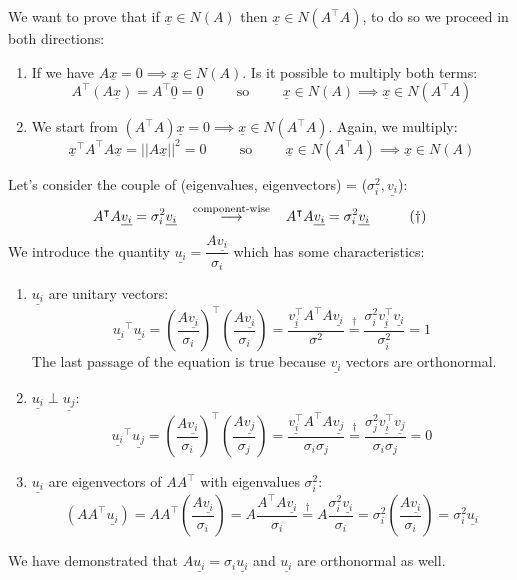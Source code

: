 We want to prove that if  $\underline{x} \in N(A)$ then $\underline{x} \in N(A^\intercal A)$, to do so we proceed in both directions:
\begin{enumerate}
    \item If we have $A\underline{x} = 0 \implies \underline{x} \in N(A)$. Is it possible to multiply both terms:
    \[
        A^\intercal(A\underline{x}) = A^\intercal \underline{0} = \underline{0} \hspace{1cm} \text{so} \hspace{1cm} \underline{x} \in N(A) \implies \underline{x} \in N(A^\intercal A)
    \]
    \item We start from $(A^\intercal A)\underline{x} = 0 \implies \underline{x} \in N(A^\intercal A)$. Again, we multiply:
    \[
        \underline{x}^\intercal A^\intercal A\underline{x} = ||A\underline{x}||^2 = 0 \hspace{1cm} \text{so} \hspace{1cm} \underline{x} \in N(A^\intercal A) \implies \underline{x} \in N(A)
    \]
\end{enumerate}
Let's consider the couple of (eigenvalues, eigenvectors) = ($\sigma_i^2, \underline{v_i}$):
\[
    A^\intercal A\underline{v_i} = \sigma_i^2 \underline{v_i} \hspace{0.3cm}\overset{\text{component-wise}}{\longrightarrow} \hspace{0.3cm} A^\intercal A\underline{v_i} = \sigma_i^2 \underline{v_i} \hspace{1cm} (\dagger)
\]
We introduce the quantity $\underline{u_i} = \dfrac{A\underline{v_i}}{\sigma_i}$ which has some characteristics:
\begin{enumerate}[i]
    \item $\underline{u_i}$ are unitary vectors:
    \[
        \underline{u_i}^\intercal \underline{u_i} = \left(\dfrac{A\underline{v_i}}{\sigma_i}\right)^\intercal \left(\dfrac{A\underline{v_i}}{\sigma_i}\right) = \dfrac{\underline{v_i^\intercal}A^\intercal A\underline{v_i}}{\sigma^2} \overset{\dagger}{=} \dfrac{\sigma_i^2 \underline{v_i^\intercal}\underline{v_i}}{\sigma_i^2} = 1
    \]
    The last passage of the equation is true because $\underline{v_i}$ vectors are orthonormal.
    \item $\underline{u_i} \perp \underline{u_j}$:
    \[
        \underline{u_i}^\intercal \underline{u_j} = \left(\dfrac{A\underline{v_i}}{\sigma_i}\right)^\intercal \left(\dfrac{A\underline{v_j}}{\sigma_j}\right) = \dfrac{\underline{v_i^\intercal}A^\intercal A\underline{v_j}}{\sigma_i \sigma_j} \overset{\dagger}{=} \dfrac{\sigma_j^2 \underline{v_i^\intercal}\underline{v_j}}{\sigma_i \sigma_j} = 0
    \] 
    \item $\underline{u_i}$ are eigenvectors of $AA^\intercal$ with eigenvalues $\sigma_i^2$:
    \[
        (AA^\intercal \underline{u_i}) = AA^\intercal\left(\dfrac{A\underline{v_i}}{\sigma_i}\right) = A\dfrac{A^\intercal A\underline{v_i}}{\sigma_i} \overset{\dagger}{=} A\dfrac{\sigma_i^2 \underline{v_i}}{\sigma_i} = \sigma_i^2\left(\dfrac{A\underline{v_i}}{\sigma_i}\right) = \sigma_i^2\underline{u_i}   
    \]
\end{enumerate}
We have demonstrated that $A\underline{u_i} = \sigma_i \underline{u_i}$ and $\underline{u_i}$ are orthonormal as well. 